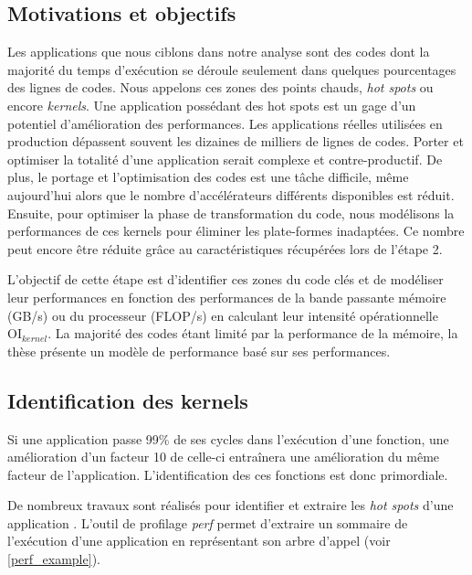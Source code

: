\subsection{Motivations et objectifs}



Les applications que nous ciblons dans notre analyse sont des codes dont la majorité du temps d'exécution se déroule seulement dans quelques pourcentages des lignes de codes. Nous appelons ces zones des points chauds, \textit{hot spots} ou encore \textit{kernels}. Une application possédant des hot spots est un gage d'un potentiel d'amélioration des performances. Les applications réelles utilisées en production dépassent souvent les dizaines de milliers de lignes de codes. Porter et optimiser la totalité d'une application serait complexe et contre-productif. De plus, le portage et l'optimisation des codes est une tâche difficile, même aujourd'hui alors que le nombre d'accélérateurs différents disponibles est réduit. Ensuite, pour optimiser la phase de transformation du code, nous modélisons la performances de ces kernels pour éliminer les plate-formes inadaptées. Ce nombre peut encore être réduite grâce au caractéristiques récupérées lors de l'étape 2.  


L'objectif de cette étape est d'identifier ces zones du code clés et de modéliser leur performances en fonction des performances de la bande passante mémoire (GB/s) ou du processeur (FLOP/s) en calculant leur intensité opérationnelle $\text{OI}_{kernel}$. La majorité des codes étant limité par la performance de la mémoire, la thèse présente un modèle de performance basé sur ses performances. 


\subsection{Identification des kernels}

Si une application passe 99\% de ses cycles dans l'exécution d'une fonction, une amélioration d'un facteur 10 de celle-ci entraînera une amélioration du même facteur de l'application. L'identification des ces fonctions est donc primordiale. 

De nombreux travaux sont réalisés pour identifier et extraire les \textit{hot spots} d'une application \cite{castro2015cere, brunst2013custom}. L'outil de profilage \textit{perf} \cite{de2010new} permet d'extraire un sommaire de l'exécution d'une application en représentant son arbre d'appel (voir \autoref{perf_example}). 



